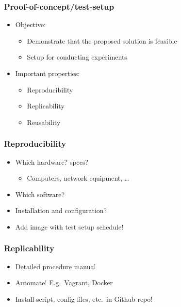 \documentclass[aspectratio=169]{beamer}
\begin{document}
\begin{frame}
  \frametitle{Proof-of-concept/test-setup}

  \begin{itemize}
    \item Objective:
          \begin{itemize}
            \item Demonstrate that the proposed solution is feasible
            \item Setup for conducting experiments
          \end{itemize}
    \item Important properties:
          \begin{itemize}
            \item Reproducibility
            \item Replicability
            \item Reusability
          \end{itemize}
  \end{itemize}

\end{frame}

\begin{frame}
  \frametitle{Reproducibility}


  \bigskip

  \begin{itemize}
    \item Which hardware? specs?
          \begin{itemize}
            \item Computers, network equipment, \ldots
          \end{itemize}
    \item Which software?
    \item Installation and configuration?
    \item Add image with test setup schedule!
  \end{itemize}

\end{frame}

\begin{frame}
  \frametitle{Replicability}


  \bigskip

  \begin{itemize}
    \item Detailed procedure manual
    \item Automate! E.g.\ Vagrant, Docker
    \item Install script, config files, etc.\ in Github repo!
  \end{itemize}

\end{frame}
\end{document}
